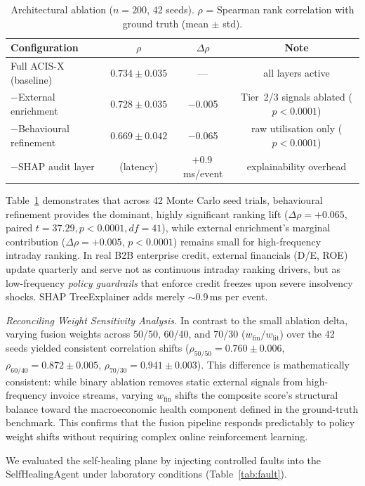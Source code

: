 \documentclass[runningheads]{llncs}
\begin{document}
\begin{table}[htbp]
\caption{Architectural ablation ($n{=}200$, 42 seeds). $\rho$ = Spearman rank correlation with ground truth (mean $\pm$ std).}
\label{tab:ablation}
\centering\scriptsize
\begin{tabular}{@{}lccc@{}}
\toprule
\textbf{Configuration} & \textbf{$\rho$} & \textbf{$\Delta\rho$} & \textbf{Note} \\
\midrule
Full ACIS-X (baseline) & $0.734 \pm 0.035$ & --- & all layers active \\
$-$External enrichment & $0.728 \pm 0.035$ & $-$0.005 & Tier~2/3 signals ablated ($p<0.0001$) \\
$-$Behavioural refinement & $0.669 \pm 0.042$ & $-$0.065 & raw utilisation only ($p<0.0001$) \\
$-$SHAP audit layer & (latency) & $+$0.9\,ms/event & explainability overhead \\
\bottomrule
\end{tabular}
\end{table}

Table~\ref{tab:ablation} demonstrates that across 42 Monte Carlo seed trials, behavioural refinement provides the dominant, highly significant ranking lift ($\Delta\rho=+0.065$, paired $t=37.29, p<0.0001, df=41$), while external enrichment's marginal contribution ($\Delta\rho=+0.005$, $p<0.0001$) remains small for high-frequency intraday ranking. In real B2B enterprise credit, external financials (D/E, ROE) update quarterly and serve not as continuous intraday ranking drivers, but as low-frequency \textit{policy guardrails} that enforce credit freezes upon severe insolvency shocks. SHAP TreeExplainer adds merely $\sim$0.9\,ms per event.

\noindent\textit{Reconciling Weight Sensitivity Analysis.} In contrast to the small ablation delta, varying fusion weights across 50/50, 60/40, and 70/30 ($w_{\text{fin}}/w_{\text{lit}}$) over the 42 seeds yielded consistent correlation shifts ($\rho_{50/50}=0.760\pm0.006$, $\rho_{60/40}=0.872\pm0.005$, $\rho_{70/30}=0.941\pm0.003$). This difference is mathematically consistent: while binary ablation removes static external signals from high-frequency invoice streams, varying $w_{\text{fin}}$ shifts the composite score's structural balance toward the macroeconomic health component defined in the ground-truth benchmark. This confirms that the fusion pipeline responds predictably to policy weight shifts without requiring complex online reinforcement learning.

We evaluated the self-healing plane by injecting controlled faults into the SelfHealingAgent under laboratory conditions (Table~\ref{tab:fault}).
\end{document}
